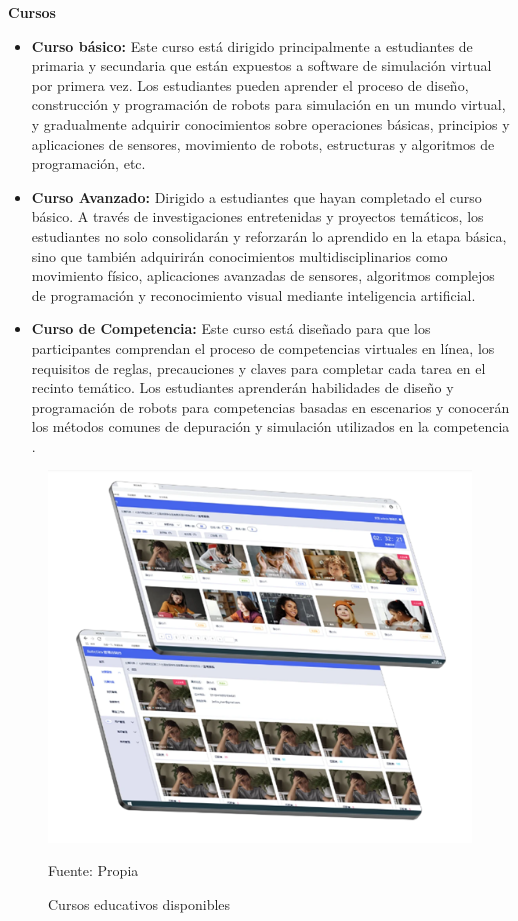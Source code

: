 \textbf{Cursos}

\begin{itemize}
    \item \textbf{Curso básico:} Este curso está dirigido principalmente a estudiantes de primaria y secundaria que están expuestos a software de simulación virtual por primera vez. Los estudiantes pueden aprender el proceso de diseño, construcción y programación de robots para simulación en un mundo virtual, y gradualmente adquirir conocimientos sobre operaciones básicas, principios y aplicaciones de sensores, movimiento de robots, estructuras y algoritmos de programación, etc.
    
    \item \textbf{Curso Avanzado:} Dirigido a estudiantes que hayan completado el curso básico. A través de investigaciones entretenidas y proyectos temáticos, los estudiantes no solo consolidarán y reforzarán lo aprendido en la etapa básica, sino que también adquirirán conocimientos multidisciplinarios como movimiento físico, aplicaciones avanzadas de sensores, algoritmos complejos de programación y reconocimiento visual mediante inteligencia artificial.
     
    \item \textbf{Curso de Competencia:} Este curso está diseñado para que los participantes comprendan el proceso de competencias virtuales en línea, los requisitos de reglas, precauciones y claves para completar cada tarea en el recinto temático. Los estudiantes aprenderán habilidades de diseño y programación de robots para competencias basadas en escenarios y conocerán los métodos comunes de depuración y simulación utilizados en la competencia \cite{robosim}.
\end{itemize}

\begin{figure}[H]
    \centering
    \includegraphics[scale = 0.90]{Imagenes/cursoseduc.png}
    \caption{Cursos educativos disponibles}{Fuente: Propia}
\end{figure}

